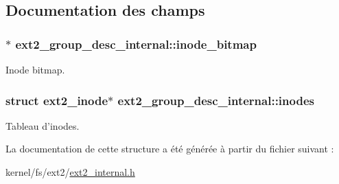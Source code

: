\subsection{Documentation des champs}
\hypertarget{structext2__group__desc__internal_a5b3cee6954ef4ed21c238b46d389b9bf}{
\subsubsection[{inode\-\_\-bitmap}]{$\ast$ ext2\-\_\-group\-\_\-desc\-\_\-internal\-::inode\-\_\-bitmap}}\label{structext2__group__desc__internal_a5b3cee6954ef4ed21c238b46d389b9bf}
Inode bitmap. \hypertarget{structext2__group__desc__internal_a690f836bfb2c8de04ae2b1753134f8a7}{
\subsubsection[{inodes}]{\setlength{\rightskip}{0pt plus 5cm}struct {\bf ext2\-\_\-inode}$\ast$ ext2\-\_\-group\-\_\-desc\-\_\-internal\-::inodes}}\label{structext2__group__desc__internal_a690f836bfb2c8de04ae2b1753134f8a7}
Tableau d'inodes. 

La documentation de cette structure a été générée à partir du fichier suivant \-:\begin{DoxyCompactItemize}
\item 
kernel/fs/ext2/\hyperlink{ext2__internal_8h}{ext2\-\_\-internal.\-h}\end{DoxyCompactItemize}
